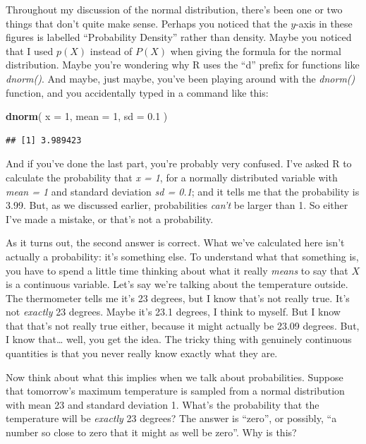 \documentclass[]{book}
\newenvironment{Shaded}{\begin{snugshade}}{\end{snugshade}}
\newcommand{\DataTypeTok}[1]{\textcolor[rgb]{0.13,0.29,0.53}{#1}}
\newcommand{\DecValTok}[1]{\textcolor[rgb]{0.00,0.00,0.81}{#1}}
\newcommand{\FloatTok}[1]{\textcolor[rgb]{0.00,0.00,0.81}{#1}}
\newcommand{\KeywordTok}[1]{\textcolor[rgb]{0.13,0.29,0.53}{\textbf{#1}}}
\newcommand{\NormalTok}[1]{#1}
\begin{document}
Throughout my discussion of the normal distribution, there's been one or two things that don't quite make sense. Perhaps you noticed that the \(y\)-axis in these figures is labelled ``Probability Density'' rather than density. Maybe you noticed that I used \(p(X)\) instead of \(P(X)\) when giving the formula for the normal distribution. Maybe you're wondering why R uses the ``d'' prefix for functions like \emph{dnorm()}. And maybe, just maybe, you've been playing around with the \emph{dnorm()} function, and you accidentally typed in a command like this:

\begin{Shaded}
\begin{Highlighting}[]
\KeywordTok{dnorm}\NormalTok{( }\DataTypeTok{x =} \DecValTok{1}\NormalTok{, }\DataTypeTok{mean =} \DecValTok{1}\NormalTok{, }\DataTypeTok{sd =} \FloatTok{0.1}\NormalTok{ )}
\end{Highlighting}
\end{Shaded}

\begin{verbatim}
## [1] 3.989423
\end{verbatim}

And if you've done the last part, you're probably very confused. I've asked R to calculate the probability that \emph{x = 1}, for a normally distributed variable with \emph{mean = 1} and standard deviation \emph{sd = 0.1}; and it tells me that the probability is 3.99. But, as we discussed earlier, probabilities \emph{can't} be larger than 1. So either I've made a mistake, or that's not a probability.

As it turns out, the second answer is correct. What we've calculated here isn't actually a probability: it's something else. To understand what that something is, you have to spend a little time thinking about what it really \emph{means} to say that \(X\) is a continuous variable. Let's say we're talking about the temperature outside. The thermometer tells me it's 23 degrees, but I know that's not really true. It's not \emph{exactly} 23 degrees. Maybe it's 23.1 degrees, I think to myself. But I know that that's not really true either, because it might actually be 23.09 degrees. But, I know that\ldots{} well, you get the idea. The tricky thing with genuinely continuous quantities is that you never really know exactly what they are.

Now think about what this implies when we talk about probabilities. Suppose that tomorrow's maximum temperature is sampled from a normal distribution with mean 23 and standard deviation 1. What's the probability that the temperature will be \emph{exactly} 23 degrees? The answer is ``zero'', or possibly, ``a number so close to zero that it might as well be zero''. Why is this?
\end{document}
